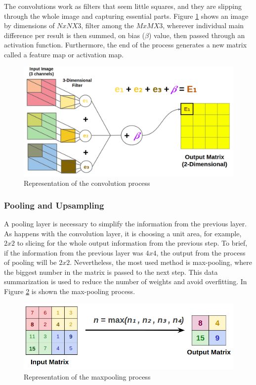 The convolutions work as filters that seem little squares, and they are slipping through the whole image and capturing essential parts.  Figure \ref{fig:bias} shows an image by dimensions of $NxNX3$, filter among the $MxMX3$, wherever individual main difference per result is then summed, on bias ($\beta$) value, then passed through an activation function. Furthermore, the end of the process generates a new matrix called a feature map or activation map.


\begin{figure}[H]
\centering
\includegraphics[scale=0.35]{imagens/three_dim_conv_2.png}
\caption{Representation of the convolution process \cite{lecture}}
\label{fig:bias}
\end{figure}




\subsubsection{Pooling and Upsampling}\label{sub:pooling}

A pooling layer is necessary to simplify the information from the previous layer. As happens with the convolution layer, it is choosing a unit area, for example, $2x2$ to slicing for the whole output information from the previous step. To brief, if the information from the previous layer was $4x4$, the output from the process of pooling will be $2x2$. Nevertheless, the most used method is max-pooling, where the biggest number in the matrix is passed to the next step. This data summarization is used to reduce the number of weights and avoid overfitting. In Figure \ref{fig:pooling} is shown the max-pooling process.

\begin{figure}[H]
\centering
\includegraphics[scale=0.35]{imagens/max_pooling.png}
\caption{Representation of the maxpooling process \cite{lecture}}
\label{fig:pooling}
\end{figure}




